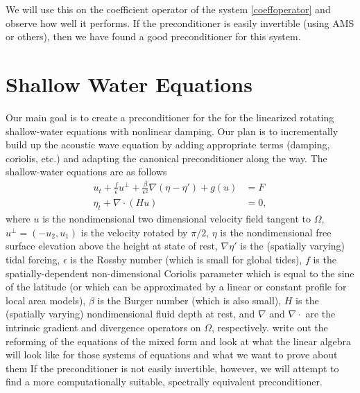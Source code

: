 \documentclass[11pt]{article}
\begin{document}
 We will use this on the coefficient operator of the system \eqref{coeffoperator} and observe how well it performs. If the preconditioner is easily invertible (using AMS or others), then we have found a good preconditioner for this system.


\section{Shallow Water Equations}
 Our main goal is to create a preconditioner for the for the linearized rotating shallow-water equations with nonlinear damping. Our plan is to incrementally build up the acoustic wave equation by adding appropriate terms (damping, coriolis, etc.) and adapting the canonical preconditioner along the way. The shallow-water equations are as follows
\begin{equation}
\begin{split}
u_t + \frac{f}{\epsilon}u^{\perp}+\frac{\beta}{\epsilon^2}\nabla(\eta - \eta')+g(u) &= F\\
\eta_t + \nabla \cdot (Hu) &= 0,
\end{split}
\end{equation}
where $u$ is the nondimensional two dimensional velocity field tangent to $\Omega$, $u^\perp = (-u_2,u_1)$ is the velocity rotated by $\pi/2$, $\eta$ is the nondimensional free surface elevation above the height at state of rest, $\nabla\eta'$ is the (spatially varying) tidal forcing, $\epsilon$ is the Rossby number (which is small for global tides), $f$ is the spatially-dependent non-dimensional Coriolis parameter which is equal to the sine of the latitude (or which can be approximated by a linear or constant profile for local area models), $\beta$ is the Burger number (which is also small), $H$ is the (spatially varying) nondimensional fluid depth at rest, and $\nabla$ and $\nabla \cdot$ are the intrinsic gradient and divergence operators on $\Omega$, respectively.
write out the reforming of the equations of the mixed form
and look at what the linear algebra will look like for those systems of equations and what we want to prove about them
If the preconditioner is not easily invertible, however, we will attempt to find a more computationally suitable, spectrally equivalent preconditioner.
\end{document}
